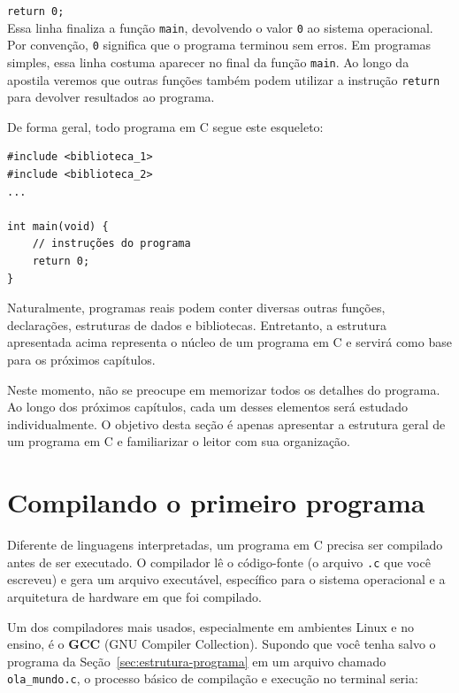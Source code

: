 \texttt{return 0;} \\
Essa linha finaliza a função \texttt{main}, devolvendo o valor \texttt{0} ao sistema operacional. Por convenção, \texttt{0} significa que o programa terminou sem erros. Em programas simples, essa linha costuma aparecer no final da função \texttt{main}. Ao longo da apostila veremos que outras funções também podem utilizar a instrução \texttt{return} para devolver resultados ao programa.

De forma geral, todo programa em C segue este esqueleto:

\begin{lstlisting}
#include <biblioteca_1>
#include <biblioteca_2>
...

int main(void) {
    // instruções do programa
    return 0;
}
\end{lstlisting}

Naturalmente, programas reais podem conter diversas outras funções, declarações, estruturas de dados e bibliotecas. Entretanto, a estrutura apresentada acima representa o núcleo de um programa em C e servirá como base para os próximos capítulos.

\begin{observacao}

Neste momento, não se preocupe em memorizar todos os detalhes do programa.
Ao longo dos próximos capítulos, cada um desses elementos será estudado
individualmente. O objetivo desta seção é apenas apresentar a estrutura geral
de um programa em C e familiarizar o leitor com sua organização.

\end{observacao}


\section{Compilando o primeiro programa}

Diferente de linguagens interpretadas, um programa em C precisa ser compilado antes de ser executado. O compilador lê o código-fonte (o arquivo \texttt{.c} que você escreveu) e gera um arquivo executável, específico para o sistema operacional e a arquitetura de hardware em que foi compilado.

Um dos compiladores mais usados, especialmente em ambientes Linux e no ensino, é o \textbf{GCC} (GNU Compiler Collection). Supondo que você tenha salvo o programa da Seção~\ref{sec:estrutura-programa} em um arquivo chamado \texttt{ola\_mundo.c}, o processo básico de compilação e execução no terminal seria:


